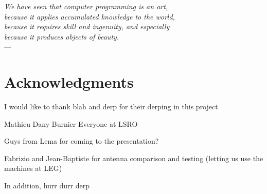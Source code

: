 
\begin{flushright}{\slshape    
    We have seen that computer programming is an art, \\ 
    because it applies accumulated knowledge to the world, \\ 
    because it requires skill and ingenuity, and especially \\
    because it produces objects of beauty.} \\ \medskip
    ---  \citep{knuth:1974}
\end{flushright}



\bigskip

\begingroup
\let\clearpage\relax
\let\cleardoublepage\relax
\let\cleardoublepage\relax
\chapter*{Acknowledgments}

I would like to thank blah and derp for their derping in this project

Mathieu
Dany Burnier
Everyone at LSRO

Guys from Lema for coming to the presentation?

Fabrizio and Jean-Baptiste for antenna comparison and testing (letting us use
the machines at LEG)


\bigskip

\noindent In addition, hurr durr derp

\endgroup



